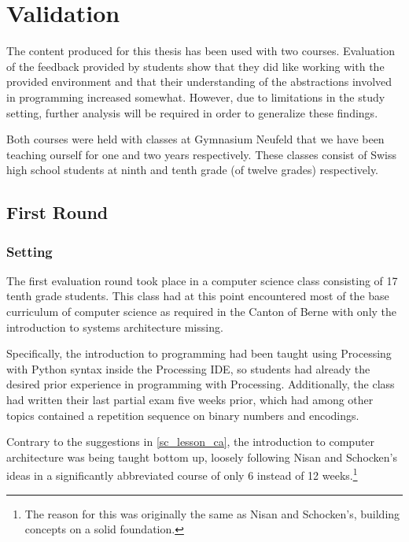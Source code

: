 
\chapter{Validation} \label{ch_practice}

The content produced for this thesis has been used with two courses. Evaluation of the feedback provided by students show that they did like working with the provided environment and that their understanding of the abstractions involved in programming increased somewhat. However, due to limitations in the study setting, further analysis will be required in order to generalize these findings.

Both courses were held with classes at Gymnasium Neufeld that we have been teaching ourself for one and two years respectively. These classes consist of Swiss high school students at ninth and tenth grade (of twelve grades) respectively.


\section{First Round} \label{sc_validation_ca} %

\subsection{Setting}

The first evaluation round took place in a computer science class consisting of 17 tenth grade students. This class had at this point encountered most of the base curriculum of computer science as required in the Canton of Berne \cite[p.\,145--146]{Erz16} with only the introduction to systems architecture missing.

Specifically, the introduction to programming had been taught using Processing with Python syntax inside the Processing \ac{IDE}, so students had already the desired prior experience in programming with Processing. Additionally, the class had written their last partial exam five weeks prior, which had among other topics contained a repetition sequence on binary numbers and encodings.

Contrary to the suggestions in \ref{sc_lesson_ca}, the introduction to computer architecture was being taught bottom up, loosely following Nisan and Schocken's ideas \cite{Nis21} in a significantly abbreviated course of only 6 instead of 12 weeks.\footnote{The reason for this was originally the same as Nisan and Schocken's, \ie building concepts on a solid foundation.}

